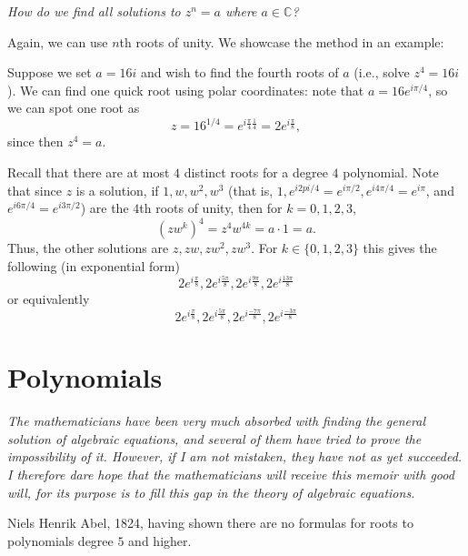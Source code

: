\documentclass[11pt,dvipsnames]{book}
\numberwithin{equation}{section} %
\numberwithin{figure}{section} %
\numberwithin{table}{section} %
\begin{document}
\begin{center}
{\it How do we find all solutions to $
z^{n}=a$ where $a\in\mathbb{C}$?}
\end{center}

Again, we can use $n$th roots of unity. We showcase the method in an example:



\begin{example}

Suppose we set $a=16i$ and wish to find the fourth roots of $a$ (i.e., solve $z^4=16i$). We can find one quick root using polar coordinates: note that $a=16e^{i\pi/4}$, so we can spot one root as
\[
z=16^{1/4}=e^{i\frac{\pi}{4}\frac{1}{4}} = 2e^{i\frac{\pi}{8}},\]
since then $z^{4} = a$. 

Recall that there are at most $4$ distinct roots for a degree $4$ polynomial. Note that since $z$ is a solution, if $1,w,w^2,w^3$ (that is, $1,e^{i2pi/4}=e^{i\pi/2}, e^{i4\pi/4}=e^{i\pi}$, and $e^{i6\pi/4}=e^{i3\pi/2}$) are the $4$th roots of unity, then for $k=0,1,2,3$,
\[
(zw^{k})^{4}=z^{4}w^{4k}=a\cdot 1=a.
\]
Thus, the other solutions are $z,zw,zw^2,zw^3$. For $k \in \{0,1,2,3\}$ this gives the following (in exponential form)
\vspace{-1mm}
\[ 2e^{i\frac{\pi}{8}},2e^{i\frac{5\pi}{8}},2e^{i\frac{9\pi}{8}},2e^{i\frac{13\pi}{8}}\]
\vspace{-1mm} 
or equivalently
\vspace{-1mm}
\[ 2e^{i\frac{\pi}{8}},2e^{i\frac{5\pi}{8}},2e^{i\frac{-7\pi}{8}},2e^{i\frac{-3\pi}{8}}\]
\end{example}

 


\chapter{Polynomials}


\epigraph{\it  The mathematicians have been very much absorbed with finding the general solution of algebraic equations, and several of them have tried to prove the impossibility of it. However, if I am not mistaken, they have not as yet succeeded. I therefore dare hope that the mathematicians will receive this memoir with good will, for its purpose is to fill this gap in the theory of algebraic equations.}{Niels Henrik Abel, 1824, having shown there are no formulas for roots to polynomials degree $5$ and higher.}
\end{document}
